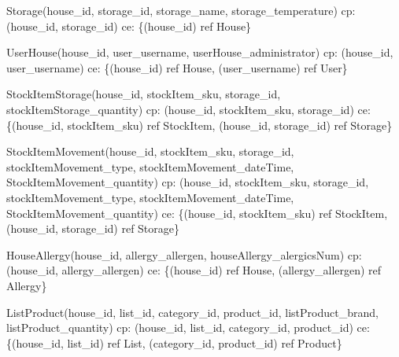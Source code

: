 {\begin{description}
		\item Storage(house\_id, storage\_id, storage\_name, storage\_temperature)  \newline
		\acrshort{cp}:(house\_id, storage\_id) \newline
		\acrshort{ce}: \{(house\_id) ref House\}
	
		\item UserHouse(house\_id, user\_username, userHouse\_administrator) \newline
		\acrshort{cp}: (house\_id, user\_username) \newline
		\acrshort{ce}: \{(house\_id) ref House, (user\_username) ref User\}
		
		\item StockItemStorage(house\_id, stockItem\_sku, storage\_id, stockItemStorage\_quantity) \newline
		\acrshort{cp}: (house\_id, stockItem\_sku, storage\_id) \newline
		\acrshort{ce}: \{(house\_id, stockItem\_sku) ref StockItem, (house\_id, storage\_id) ref Storage\}
		
		\item StockItemMovement(house\_id, stockItem\_sku, storage\_id, stockItemMovement\_type, \newline stockItemMovement\_dateTime, StockItemMovement\_quantity) \newline
		\acrshort{cp}: (house\_id, stockItem\_sku, storage\_id, stockItemMovement\_type, \newline stockItemMovement\_dateTime, StockItemMovement\_quantity) \newline
		\acrshort{ce}: \{(house\_id, stockItem\_sku) ref StockItem, (house\_id, storage\_id) ref Storage\}
		
		\item HouseAllergy(house\_id, allergy\_allergen, houseAllergy\_alergicsNum) \newline
		\acrshort{cp}: (house\_id, allergy\_allergen) \newline
		\acrshort{ce}: \{(house\_id) ref House, (allergy\_allergen) ref Allergy\}
	
		\item ListProduct(house\_id, list\_id, category\_id, product\_id, listProduct\_brand, listProduct\_quantity) \newline
		\acrshort{cp}: (house\_id, list\_id, category\_id, product\_id) \newline
		\acrshort{ce}: \{(house\_id, list\_id) ref List, (category\_id, product\_id) ref Product\}
	

\end{description}}
